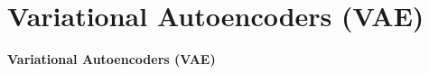 \section{Variational Autoencoders (VAE)}
\begin{frame}[plain]
    \LARGE \textbf{Variational Autoencoders (VAE)}
\end{frame}